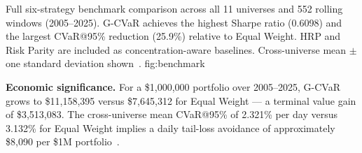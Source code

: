 \begin{table}[H]
\centering
\caption{Six-strategy benchmark comparison (Table~9B): mean $\pm$ std
         across all 11 universes, 552 windows.
         HRP~\citep{lopezdeprado2016} and Risk
         Parity~\citep{maillard2010} included as concentration-aware
         baselines. G-CVaR achieves the strongest CVaR@95\% reduction
         and the highest Sharpe.}
\label{tab:perf_all}
\end{table}

  {Full six-strategy benchmark comparison across all 11 universes
   and 552 rolling windows (2005--2025). G-CVaR achieves the highest
   Sharpe ratio (0.6098) and the largest CVaR@95\% reduction (25.9\%)
   relative to Equal Weight. HRP and Risk Parity are included as
   concentration-aware baselines. Cross-universe mean $\pm$ one
   standard deviation shown~\citep{lopezdeprado2016,maillard2010}.}
  {fig:benchmark}

\textbf{Economic significance.} For a \$1,000,000 portfolio over
2005--2025, G-CVaR grows to \$11,158,395 versus \$7,645,312 for Equal
Weight — a terminal value gain of \$3,513,083. The cross-universe mean
CVaR@95\% of 2.321\% per day versus 3.132\% for Equal Weight implies a
daily tail-loss avoidance of approximately \$8,090 per \$1M
portfolio~\citep{harvey2016,bailey2012}.

